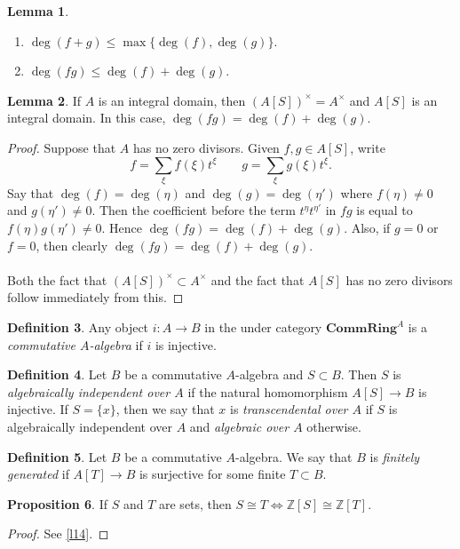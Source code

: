 \documentclass[10pt,letterpaper,cm]{nupset}
\theoremstyle{definition}
\newtheorem{definition}{Definition}[subsection]
\theoremstyle{theorem}
\newtheorem{lemma}[definition]{Lemma}
\newtheorem{prop}[definition]{Proposition}
\theoremstyle{remark}
\newcommand{\Z}{\mathbb Z}
\newcommand{\1}{\mathbf{1}}
\newcommand{\0}{\vec 0}
\begin{document}
\begin{lemma} $ $
\begin{enumerate}
\item $\deg(f+g)\leq \max \{\deg(f), \deg(g)\}$.
\item $\deg(fg) \leq \deg(f) + \deg(g)$.
\end{enumerate}
\end{lemma}

\begin{lemma}
If $A$ is an integral domain, then $(A[S])^{\times} =A^{\times}$ and $A[S]$ is an integral domain. In this case, $\deg(fg) = \deg(f) + \deg(g)$.
\end{lemma}
\begin{proof}
Suppose that $A$ has no zero divisors. Given $f,g \in A[S]$,  write 
$$ f= \sum_{\xi} f(\xi)t^{\xi}   \quad \quad  g= \sum_{\xi} g(\xi)t^{\xi}.$$ Say that $\deg(f) = \deg(\eta)$ and $\deg(g) = \deg(\eta')$ where $f(\eta) \ne 0$ and $g(\eta') \ne 0$. Then the coefficient before the term $t^{\eta}t^{\eta'}$ in $fg$ is equal to $f(\eta)g(\eta') \ne 0$. Hence $\deg(fg) = \deg(f) + \deg(g)$. Also, if $g=0$ or $f=0$, then clearly $\deg(fg) = \deg(f) + \deg(g)$.
\\ \\ 
Both the fact that $(A[S])^{\times} \subset A^{\times}$ and the fact that $A[S]$ has no zero divisors follow immediately from this.
\end{proof}

\begin{definition}
Any object $i : A \to B$ in the under category $\mathbf{CommRing}^A$ is a \textit{commutative $A$-algebra} if $i$ is injective. 
\end{definition}

\begin{definition}
Let $B$ be a commutative $A$-algebra and $S\subset B$. Then $S$ is \textit{algebraically independent over $A$} if the natural homomorphism $A[S] \to B$ is injective. If $S=\{x\}$, then we say that $x$ is \textit{transcendental over $A$} if $S$ is algebraically independent over $A$ and \textit{algebraic over $A$} otherwise.
\end{definition}

\begin{definition}
Let $B$ be a commutative $A$-algebra. We say that $B$ is \textit{finitely generated} if $A[T] \to B$ is surjective for some finite $T\subset B$.
\end{definition}

\begin{prop}
If $S$ and $T$ are sets, then $S\cong T \iff \Z[S]\cong \Z[T]$.
\end{prop}
\begin{proof}
See \cref{l14}.
\end{proof}
\end{document}
